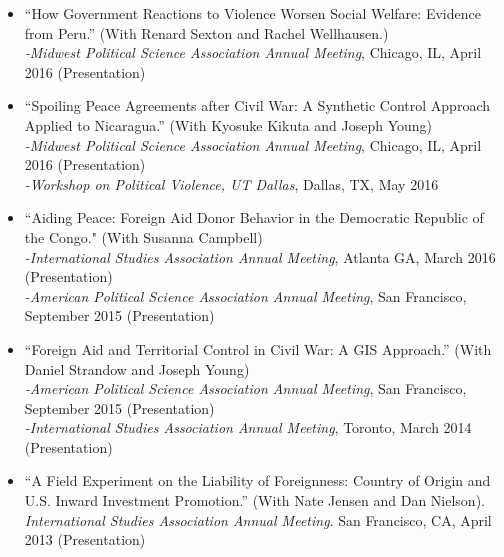 \documentclass[10pt]{article}
\begin{document}
\begin{itemize}
\item ``How Government Reactions to Violence Worsen Social Welfare: Evidence from Peru.'' (With Renard Sexton and Rachel Wellhausen.)
	\\ \indent \textit{-Midwest Political Science Association Annual Meeting}, Chicago, IL, April 2016 (Presentation)

\item ``Spoiling Peace Agreements after Civil War: A Synthetic Control Approach Applied to Nicaragua.'' (With Kyosuke Kikuta and Joseph Young)
	\\ \indent \textit{-Midwest Political Science Association Annual Meeting}, Chicago, IL, April 2016 (Presentation)
	\\ \indent \textit{-Workshop on Political Violence, UT Dallas}, Dallas, TX, May 2016

\item ``Aiding Peace: Foreign Aid Donor Behavior in the Democratic Republic of the Congo." (With Susanna Campbell)
	\\ \indent \textit{-International Studies Association Annual Meeting}, Atlanta GA, March 2016 (Presentation)
	\\ \indent \textit{-American Political Science Association Annual Meeting}, San Francisco, September 2015 (Presentation)


\item ``Foreign Aid and Territorial Control in Civil War: A GIS Approach.'' (With Daniel Strandow and Joseph Young)
	\\ \indent \textit{-American Political Science Association Annual Meeting}, San Francisco, September 2015 (Presentation)
	\\ \indent \textit{-International Studies Association Annual Meeting}, Toronto, March 2014 (Presentation)
	
\item ``A Field Experiment on the Liability of Foreignness: 	Country of Origin and U.S. Inward Investment Promotion.'' (With Nate Jensen and Dan Nielson). 
	\\ \indent \textit{International Studies Association Annual Meeting}. San Francisco, CA, April 2013 (Presentation)


\end{itemize}
\end{document}
